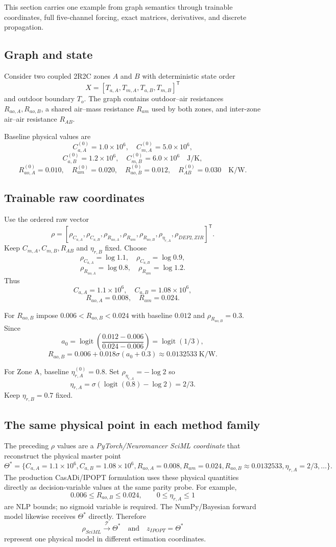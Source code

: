 \documentclass[11pt]{article}
\newcommand{\logit}{\operatorname{logit}}
\newcommand{\sigmoid}{\sigma}
\begin{document}
This section carries one example from graph semantics through trainable
coordinates, full five-channel forcing, exact matrices, derivatives, and
discrete propagation.

\subsection{Graph and state}
Consider two coupled 2R2C zones $A$ and $B$ with deterministic state order
\[
\boxed{X=[T_{a,A},T_{m,A},T_{a,B},T_{m,B}]^{\mathsf T}}
\]
and outdoor boundary $T_o$. The graph contains outdoor--air resistances
$R_{ao,A},R_{ao,B}$, a shared air--mass resistance $R_{am}$ used by both zones,
and inter-zone air--air resistance $R_{AB}$.

Baseline physical values are
\[
C_{a,A}^{(0)}=1.0\times10^6,\quad
C_{m,A}^{(0)}=5.0\times10^6,
\]
\[
C_{a,B}^{(0)}=1.2\times10^6,\quad
C_{m,B}^{(0)}=6.0\times10^6\quad\text{J/K},
\]
\[
R_{ao,A}^{(0)}=0.010,\quad
R_{am}^{(0)}=0.020,\quad
R_{ao,B}^{(0)}=0.012,\quad
R_{AB}^{(0)}=0.030\quad\text{K/W}.
\]

\subsection{Trainable raw coordinates}
Use the ordered raw vector
\[
\boxed{
\rho=
[\rho_{C_{a,A}},\rho_{C_{a,B}},\rho_{R_{ao,A}},
\rho_{R_{am}},\rho_{R_{ao,B}},\rho_{\eta_{r,A}},
\rho_{DEP2,ZIR}]^{\mathsf T}.
}
\]
Keep $C_{m,A},C_{m,B},R_{AB}$ and $\eta_{r,B}$ fixed.
Choose
\[
\rho_{C_{a,A}}=\log1.1,
\quad
\rho_{C_{a,B}}=\log0.9,
\]
\[
\rho_{R_{ao,A}}=\log0.8,
\quad
\rho_{R_{am}}=\log1.2.
\]
Thus
\[
C_{a,A}=1.1\times10^6,
\quad C_{a,B}=1.08\times10^6,
\]
\[
R_{ao,A}=0.008,
\quad R_{am}=0.024.
\]

For $R_{ao,B}$ impose $0.006<R_{ao,B}<0.024$ with baseline $0.012$ and
$\rho_{R_{ao,B}}=0.3$. Since
\[
a_0=\logit\left(\frac{0.012-0.006}{0.024-0.006}\right)=\logit(1/3),
\]
\[
\boxed{R_{ao,B}=0.006+0.018\sigmoid(a_0+0.3)\approx0.0132533\;\text{K/W}.}
\]

For Zone A, baseline $\eta_{r,A}^{(0)}=0.8$. Set
$\rho_{\eta_{r,A}}=-\log2$ so
\[
\eta_{r,A}=\sigmoid(\logit(0.8)-\log2)=\boxed{2/3}.
\]
Keep $\eta_{r,B}=0.7$ fixed.

\subsection{The same physical point in each method family}
The preceding $\rho$ values are a \emph{PyTorch/Neuromancer SciML coordinate}
that reconstruct the physical master point
\[
\Theta^*=
\{C_{a,A}=1.1\times10^6,
C_{a,B}=1.08\times10^6,
R_{ao,A}=0.008,
R_{am}=0.024,
R_{ao,B}\approx0.0132533,
\eta_{r,A}=2/3,\ldots\}.
\]
The production CasADi/IPOPT formulation uses these physical quantities directly
as decision-variable values at the same parity probe. For example,
\[
0.006\le R_{ao,B}\le0.024,\qquad 0\le\eta_{r,A}\le1
\]
are NLP bounds; no sigmoid variable is required. The NumPy/Bayesian forward
model likewise receives $\Theta^*$ directly. Therefore
\[
\boxed{
\rho_{SciML}\xrightarrow{\mathcal T}\Theta^*
\quad\text{and}\quad
z_{IPOPT}=\Theta^*
}
\]
represent one physical model in different estimation coordinates.
\end{document}
